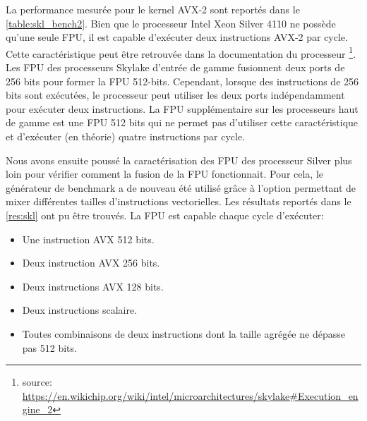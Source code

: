         La performance mesurée pour le kernel AVX-2 sont reportés dans le \autoref{table:skl_bench2}.  Bien que le processeur Intel Xeon Silver 4110 ne possède qu'une seule FPU, il est capable d'exécuter deux instructions AVX-2 par cycle. Cette caractéristique peut être retrouvée dans la documentation du processeur \footnote{source: \url{https://en.wikichip.org/wiki/intel/microarchitectures/skylake\#Execution_engine_2}}. Les FPU des processeurs Skylake d'entrée de gamme fusionnent deux ports de 256 bits pour former la FPU 512-bits. Cependant, lorsque des instructions de 256 bits sont exécutées, le processeur peut utiliser les deux ports indépendamment pour exécuter deux instructions. La FPU supplémentaire sur les processeurs haut de gamme est une FPU 512 bits qui ne permet pas d'utiliser cette caractéristique et d'exécuter (en théorie) quatre instructions par cycle. 

        Nous avons ensuite poussé la caractérisation des FPU des processeur Silver plus loin pour vérifier comment la fusion de la FPU fonctionnait. Pour cela, le générateur de benchmark a de nouveau été utilisé grâce à l'option permettant de mixer différentes tailles d'instructions vectorielles. Les résultats reportés dans le \autoref{res:skl} ont pu être trouvés. La FPU est capable chaque cycle d'exécuter: 


        \begin{itemize}
            \item Une instruction AVX 512 bits.
            \item Deux instruction AVX 256 bits.
            \item Deux instructions AVX 128 bits.
            \item Deux instructions scalaire.
            \item Toutes combinaisons de deux instructions dont la taille agrégée ne dépasse pas 512 bits.
        \end{itemize}
        
